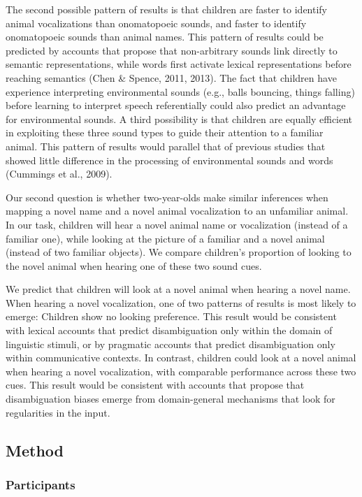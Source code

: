 \documentclass[english,floatsintext,man]{apa6}
\theoremstyle{definition}
\theoremstyle{definition}
\theoremstyle{definition}
\theoremstyle{remark}
\begin{document}
The second possible pattern of results is that children are faster to
identify animal vocalizations than onomatopoeic sounds, and faster to
identify onomatopoeic sounds than animal names. This pattern of results
could be predicted by accounts that propose that non-arbitrary sounds
link directly to semantic representations, while words first activate
lexical representations before reaching semantics (Chen \& Spence, 2011,
2013). The fact that children have experience interpreting environmental
sounds (e.g., balls bouncing, things falling) before learning to
interpret speech referentially could also predict an advantage for
environmental sounds. A third possibility is that children are equally
efficient in exploiting these three sound types to guide their attention
to a familiar animal. This pattern of results would parallel that of
previous studies that showed little difference in the processing of
environmental sounds and words (Cummings et al., 2009).

Our second question is whether two-year-olds make similar inferences
when mapping a novel name and a novel animal vocalization to an
unfamiliar animal. In our task, children will hear a novel animal name
or vocalization (instead of a familiar one), while looking at the
picture of a familiar and a novel animal (instead of two familiar
objects). We compare children's proportion of looking to the novel
animal when hearing one of these two sound cues.

We predict that children will look at a novel animal when hearing a
novel name. When hearing a novel vocalization, one of two patterns of
results is most likely to emerge: Children show no looking preference.
This result would be consistent with lexical accounts that predict
disambiguation only within the domain of linguistic stimuli, or by
pragmatic accounts that predict disambiguation only within communicative
contexts. In contrast, children could look at a novel animal when
hearing a novel vocalization, with comparable performance across these
two cues. This result would be consistent with accounts that propose
that disambiguation biases emerge from domain-general mechanisms that
look for regularities in the input.

\hypertarget{method}{%
\subsection{Method}\label{method}}

\hypertarget{participants}{%
\subsubsection{Participants}\label{participants}}
\end{document}
